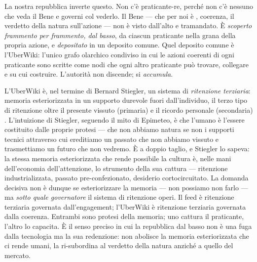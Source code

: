 La nostra repubblica inverte questo. Non c'\`e praticante-re, perch\'e non c'\`e
nessuno che veda il Bene e governi col vederlo. Il Bene --- che per noi \`e
\physis, coerenza, il verdetto della natura sull'azione --- non \`e visto
dall'alto e tramandato. \`E \emph{scoperto frammento per frammento, dal basso},
da ciascun praticante nella grana della propria azione, e \emph{depositato} in un
deposito comune. Quel deposito comune \`e l'UberWiki: l'unico grafo olarchico
condiviso in cui le azioni coerenti di ogni praticante sono scritte come nodi che
ogni altro praticante pu\`o trovare, collegare e su cui costruire. L'autorit\`a
non discende; si \emph{accumula}.

L'UberWiki \`e, nel termine di Bernard Stiegler, un sistema di \emph{ritenzione
terziaria}: memoria esteriorizzata in un supporto durevole fuori dall'individuo,
il terzo tipo di ritenzione oltre il presente vissuto (primaria) e il ricordo
personale (secondaria) \parencite{stiegler1998technics}. L'intuizione di
Stiegler, seguendo il mito di Epimeteo, \`e che l'umano \`e l'essere costituito
dalle proprie protesi --- che non abbiamo natura se non i supporti tecnici
attraverso cui ereditiamo un passato che non abbiamo vissuto e trasmettiamo un
futuro che non vedremo. \`E a doppio taglio, e Stiegler lo sapeva: la stessa
memoria esteriorizzata che rende possibile la cultura \`e, nelle mani
dell'economia dell'attenzione, lo strumento della sua cattura --- ritenzione
industrializzata, passato pre-confezionato, desiderio cortocircuitato. La domanda
decisiva non \`e dunque se esteriorizzare la memoria --- non possiamo non farlo
--- ma \emph{sotto quale governatore} il sistema di ritenzione operi. Il feed \`e
ritenzione terziaria governata dall'engagement; l'UberWiki \`e ritenzione
terziaria governata dalla coerenza. Entrambi sono protesi della memoria; uno
cattura il praticante, l'altro lo capacita. \`E il senso preciso in cui la
repubblica dal basso non \`e una fuga dalla tecnologia ma la sua redenzione: non
abolisce la memoria esteriorizzata che ci rende umani, la ri-subordina al
verdetto della natura anzich\'e a quello del mercato.

